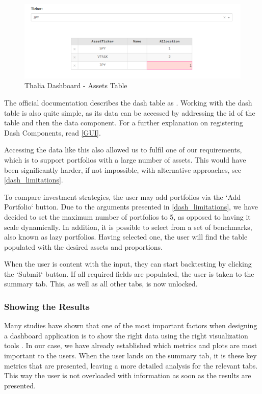 \documentclass[main.tex]{subfiles}
\begin{document}
\begin{figure}[H]
   \centering
   \includegraphics[width=\textwidth]{08Appendices/081User/081Pictures/table.png}
   \caption{Thalia Dashboard - Assets Table}
   \label{thalia_table_design}
\end{figure}

The official documentation describes the dash table as  \cite{dash_table}. Working with the dash table is also quite simple, as its data can be accessed by addressing the id of the table and then the data component. For a further explanation on registering Dash Components, read \ref{GUI}.

Accessing the data like this also allowed us to fulfil one of our requirements, which is to support portfolios with a large number of assets. This would have been significantly harder, if not impossible, with alternative approaches, see \ref{dash_limitations}.

To compare investment strategies, the user may add portfolios via the `Add Portfolio` button. Due to the arguments presented in \ref{dash_limitations}, we have decided to set the maximum number of portfolios to 5, as opposed to having it scale dynamically. In addition, it is possible to select from a set of benchmarks, also known as lazy portfolios. Having selected one, the user will find the table populated with the desired assets and proportions. 

When the user is content with the input, they can start backtesting by clicking the `Submit` button. If all required fields are populated, the user is taken to the summary tab. This, as well as all other tabs, is now unlocked.

\subsubsection*{Showing the Results}

Many studies have shown that one of the most important factors when designing a dashboard application is to show the right data using the right visualization tools \cite{dashboard_design1} \cite{dashboard_design2}. In our case, we have already established which metrics and plots are most important to the users. When the user lands on the summary tab, it is these key metrics that are presented, leaving a more detailed analysis for the relevant tabs. This way the user is not overloaded with information as soon as the results are presented. 
\end{document}
